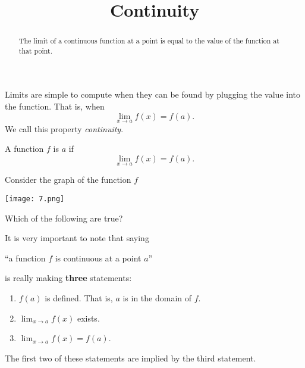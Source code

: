 \documentclass{ximera}
\title[Dig-In:]{Continuity}
\begin{document}
\begin{abstract}
The limit of a continuous function at a point is equal to the value of the function at that point. 
\end{abstract}
\maketitle


Limits are simple to compute when they can be found by plugging the
value into the function.  That is, when
\[
\lim_{x\to a}f(x) = f(a).
\]
We call this property \textit{continuity}.

\begin{definition}
  A function $f$ is  $a$ if
  \[
  \lim_{x\to a}f(x) = f(a).
  \]
\end{definition}

\begin{question}
  Consider the graph of  the function $f$ 
  \begin{image}
    \texttt{[image: 7.png]}
  \end{image}
  Which of the following are true?
  \begin{multipleChoice}
  \end{multipleChoice}
  
\end{question}

It is very important to note that saying
\begin{center}
  ``a function $f$ is continuous at a point $a$''
\end{center}
is really making \textbf{three} statements:
\begin{enumerate}
\item $f(a)$ is defined.  That is, $a$ is in the domain of $f$.
\item $\lim_{x\to a} f(x)$ exists.
\item $\lim_{x\to a} f(x) = f(a)$.
\end{enumerate}

The first two of these statements are implied by the third statement.
\end{document}
